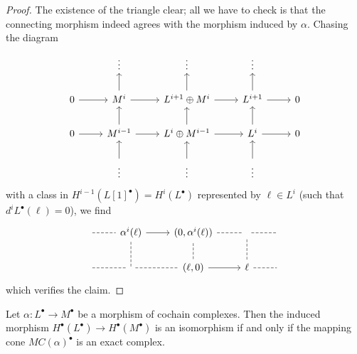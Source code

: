 \begin{proof}
The existence of the triangle clear; all we have to check is that the connecting morphism indeed agrees with the morphism induced by $\alpha$. Chasing the diagram
\[\begin{tikzcd}
&\vdots&\vdots&\vdots&\\
0\ar[r]&M^i\ar[u]\ar[r]&L^{i+1}\oplus M^i\ar[u]\ar[r]&L^{i+1}\ar[u]\ar[r]&0\\
0\ar[r]&M^{i-1}\ar[u]\ar[r]&L^{i}\oplus M^{i-1}\ar[u]\ar[r]&L^{i}\ar[u]\ar[r]&0\\
&\vdots\ar[u]&\vdots\ar[u]&\vdots\ar[u]&
\end{tikzcd}\]
with a class in $H^{i-1}(L[1]^\bullet)=H^i(L^\bullet)$ represented by $\ell\in L^i$ (such that $d^iL^\bullet(\ell)=0$), we find
\[\begin{tikzcd}
{}\ar[r,dashed, no head]&\alpha^i(\ell)\ar[r]&(0,\alpha^i(\ell))\ar[r,dashed, no head]&\ar[r,dashed, no head]&{}\\
{}\ar[r,dashed, no head]&\ar[r,dashed, no head]\ar[u,dashed, no head]&(\ell,0)\ar[r]\ar[u,dashed, no head]&\ell\ar[u,dashed, no head]\ar[r,dashed, no head]&{}
\end{tikzcd}\]
which verifies the claim.
\end{proof}
\begin{corollary}\label{MC exact iff quasi-iso}
Let $\alpha:L^\bullet\to M^\bullet$ be a morphism of cochain complexes. Then the induced morphism $H^\bullet(L^\bullet)\to H^\bullet(M^\bullet)$ is an isomorphism if 
and only if the mapping cone $MC(\alpha)^\bullet$ is an exact complex.
\end{corollary}
